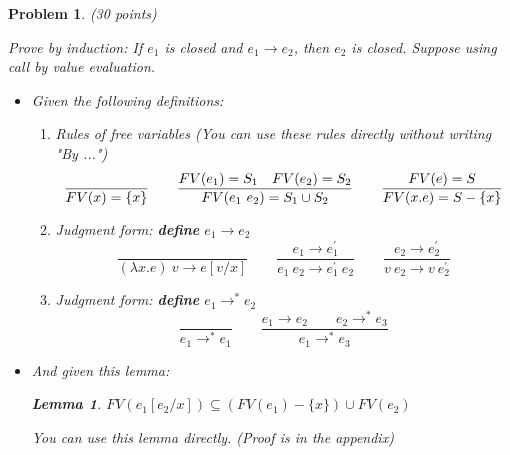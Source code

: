 \documentclass[12pt]{article}
\newtheorem{lemma}[thm]{Lemma}
\newtheorem{hw}{Problem}
\newenvironment{sol}
  {\par\vspace{3mm}\noindent{\it Solution}.}
  {\qed}
\begin{document}
\begin{hw}\rm (30 points)
		
		Prove by induction: If $e_{1}$ is closed and $e_{1} \rightarrow e_{2}$, then $e_{2}$ is closed.
	Suppose using call by value evaluation. 
	\begin{itemize}
	\item Given the following definitions:
	\begin{enumerate}
		\item Rules of free variables (You can use these rules directly without writing "By ...")
		\[
		\frac{}{FV(x)=\{x\}} \qquad
		\frac{FV(e_1) = S_1\quad FV(e_2) = S_2}{FV(e_1\ e_2)=S_1\cup S_2} \qquad
		\frac{FV(e) = S}{FV(\\x.e)=S-\{x\}}
		\]
		\item Judgment form: \textbf{define} $e_1\rightarrow e_2$
		\[
		\frac{}{(\lambda x.e)\ v \rightarrow e [v/x]}
		\qquad
		\frac{e_1 \rightarrow e_1^{'}}{e_1\ e_2 \rightarrow e_1^{'}\ e_2}
		\qquad
		\frac{e_2 \rightarrow e_2^{'}}{v\ e_2 \rightarrow v\ e_2^{'}}
		\]
		
		\item Judgment form: \textbf{define} $e_1{\rightarrow}^*e_2$
		\[
		\frac{}{e_1\rightarrow^* e_1}
		\qquad
		\frac{e_1\rightarrow e_2\qquad e_2\rightarrow^*e_3}{e_1\rightarrow^*e_3}
		\]
	\end{enumerate}
	\item And given this lemma:
		\begin{lemma}\label{fv}
			$FV(e_1[e_2/x]) \subseteq (FV(e_1) - \{x\}) \cup FV(e_2)$
		\end{lemma}
	You can use this lemma directly. (Proof is in the appendix)
	\end{itemize}	
	
\end{hw}

\end{document}
